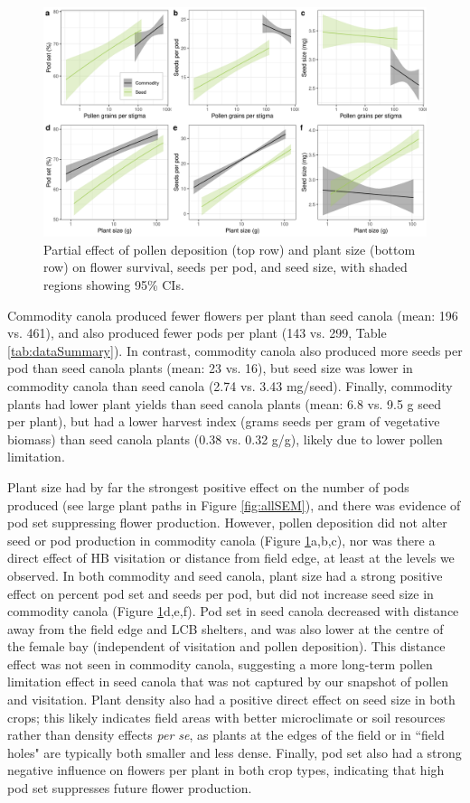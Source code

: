 \documentclass[12pt]{article} %
\begin{document}
\begin{figure}
    \centering
    \includegraphics[width=\textwidth,keepaspectratio=true]{../Figures/allSeeds.png}
    \caption{Partial effect of pollen deposition (top row) and plant size (bottom row) on flower survival, seeds per pod, and seed size, with shaded regions showing 95\% CIs.}
    \label{fig:allSeeds}
\end{figure}

Commodity canola produced fewer flowers per plant than seed canola (mean: 196 vs. 461), and also produced fewer pods per plant (143 vs. 299, Table \ref{tab:dataSummary}).
In contrast, commodity canola also produced more seeds per pod than seed canola plants (mean: 23 vs. 16), but seed size was lower in commodity canola than seed canola (2.74 vs. 3.43 mg/seed). 
Finally, commodity plants had lower plant yields than seed canola plants (mean: 6.8 vs. 9.5 g seed per plant), but had a lower harvest index (grams seeds per gram of vegetative biomass) than seed canola plants (0.38 vs. 0.32 g/g), likely due to lower pollen limitation.

Plant size had by far the strongest positive effect on the number of pods produced (see large plant paths in Figure \ref{fig:allSEM}), and there was evidence of pod set suppressing flower production.
However, pollen deposition did not alter seed or pod production in commodity canola (Figure \ref{fig:allSeeds}a,b,c), nor was there a direct effect of HB visitation or distance from field edge, at least at the levels we observed.
In both commodity and seed canola, plant size had a strong positive effect on percent pod set and seeds per pod, but did not increase seed size in commodity canola (Figure \ref{fig:allSeeds}d,e,f).
Pod set in seed canola decreased with distance away from the field edge and LCB shelters, and was also lower at the centre of the female bay (independent of visitation and pollen deposition).
This distance effect was not seen in commodity canola, suggesting a more long-term pollen limitation effect in seed canola that was not captured by our snapshot of pollen and visitation.
Plant density also had a positive direct effect on seed size in both crops; this likely indicates field areas with better microclimate or soil resources rather than density effects \emph{per se}, as plants at the edges of the field or in ``field holes" are typically both smaller and less dense.
Finally, pod set also had a strong negative influence on flowers per plant in both crop types, indicating that high pod set suppresses future flower production.
\end{document}
